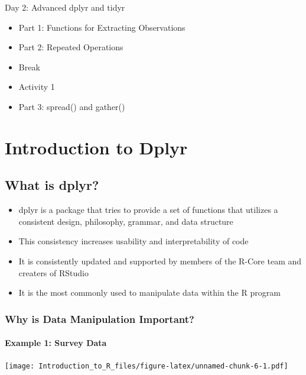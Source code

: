 \documentclass[]{book}
\providecommand{\tightlist}{%
  \setlength{\itemsep}{0pt}\setlength{\parskip}{0pt}}
\theoremstyle{definition}
\theoremstyle{definition}
\theoremstyle{definition}
\theoremstyle{remark}
\begin{document}
Day 2: Advanced dplyr and tidyr

\begin{itemize}
\tightlist
\item
  Part 1: Functions for Extracting Observations
\item
  Part 2: Repeated Operations
\item
  Break
\item
  Activity 1
\item
  Part 3: spread() and gather()
\end{itemize}

\hypertarget{part-introduction-to-dplyr}{%
\part{Introduction to Dplyr}\label{part-introduction-to-dplyr}}

\hypertarget{what-is-dplyr}{%
\chapter{What is dplyr?}\label{what-is-dplyr}}

\begin{itemize}
\tightlist
\item
  dplyr is a package that tries to provide a set of functions that utilizes a consistent design, philosophy, grammar, and data structure
\item
  This consistency increases usability and interpretability of code
\item
  It is consistently updated and supported by members of the R-Core team and creaters of RStudio
\item
  It is the most commonly used to manipulate data within the R program
\end{itemize}

\hypertarget{why-is-data-manipulation-important}{%
\section{Why is Data Manipulation Important?}\label{why-is-data-manipulation-important}}

\hypertarget{example-1-survey-data}{%
\subsection{Example 1: Survey Data}\label{example-1-survey-data}}

\texttt{[image: Introduction\_to\_R\_files/figure-latex/unnamed-chunk-6-1.pdf]}
\end{document}
